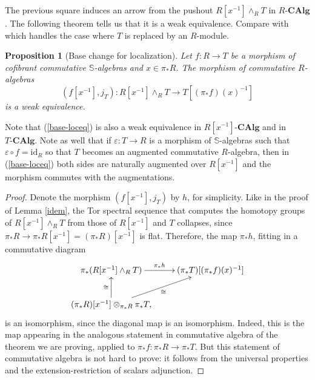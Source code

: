 \documentclass[a4paper,11pt]{amsart} %
\renewcommand{\epsilon}{\varepsilon}
\theoremstyle{definition} \newtheorem{defn}[equation]{Definition}
\theoremstyle{remark} \newtheorem{notation}[equation]{Notation}
\theoremstyle{plain} \newtheorem{teo}[equation]{Theorem}
\theoremstyle{plain} \newtheorem{lema}[equation]{Lemma}
\theoremstyle{plain} \newtheorem{prop}[equation]{Proposition}
\theoremstyle{plain} \newtheorem{corolario}[equation]{Corollary}
\theoremstyle{remark} \newtheorem{obs}[equation]{Remark}
\theoremstyle{remark} \newtheorem{sideobs}[equation]{Side remark}
\theoremstyle{remark} \newtheorem{ejercicio}[equation]{Exercise}
\theoremstyle{definition} \newtheorem{notn}[equation]{Notation}
\theoremstyle{remark} \newtheorem{ej}[equation]{Example}
\theoremstyle{remark} \newtheorem{contraej}[equation]{Counterexample}
\theoremstyle{plain} \newtheorem{conj}[equation]{Conjecture}
\renewcommand{\1}{\ensuremath{\mathbbm{1}}}
\renewcommand{\S}{\mathbb{S}}
\newcommand{\bprop}{\begin{prop}}
\newcommand{\eprop}{\end{prop}}
\newcommand{\bprf}{\begin{proof}}
\newcommand{\eprf}{\end{proof}}
\newcommand{\id}{\mathrm{id}}
\newcommand{\CAlg}{\mbox{-}\mathbf{CAlg}}
\numberwithin{equation}{section}
\begin{document}
The previous square induces an arrow from the pushout $R[x^{-1}]\wedge_R T$ in $R\CAlg$. The following theorem tells us that it is a weak equivalence. Compare with \cite[V.1.15]{ekmm} which handles the case where $T$ is replaced by an $R$-module. 

%
\bprop[Base change for localization]\label{base-loc} Let $f:R\to T$ be a morphism of cofibrant commutative $\S$-algebras and $x\in \pi_*R$. The morphism of commutative $R$-algebras \begin{equation}\label{base-loceq}(f[x^{-1}],j_T): R[x^{-1}] \wedge_R T \to T[(\pi_*f)(x)^{-1}]\end{equation} %
is a weak equivalence.
\eprop
Note that (\ref{base-loceq}) is also a weak equivalence in $R[x^{-1}]\CAlg$ and in $T\CAlg$. Note as well that if $\epsilon:T\to R$ is a morphism of $\S$-algebras such that $\epsilon \circ f=\id_R$ so that $T$ becomes an augmented commutative $R$-algebra, then in (\ref{base-loceq}) both sides are naturally augmented over $R[x^{-1}]$ and the morphism commutes with the augmentations.

\bprf Denote the morphism $(f[x^{-1}],j_T)$ by $h$, for simplicity. Like in the proof of Lemma \ref{idem}, the Tor spectral sequence that computes the homotopy groups of $R[x^{-1}]\wedge_R T$ from those of $R[x^{-1}]$ and $T$ collapses, since $\pi_*R\to \pi_*R[x^{-1}]= (\pi_*R)[x^{-1}]$ is flat. %
Therefore, the map $\pi_*h$, fitting in a commutative diagram
\[\xymatrix{\pi_*(R[x^{-1}]\wedge_R T) \ar[r]^-{\pi_*h}  & (\pi_*T)[(\pi_*f)(x)^{-1}]\\ \ar[u]^-\cong (\pi_*R)[x^{-1}] \otimes_{\pi_*R} \pi_*T, \ar[ru]_-\cong  }\]
is an isomorphism, since the diagonal map is an isomorphism. Indeed, this is the map appearing in the analogous statement in commutative algebra of the theorem we are proving, applied to $\pi_*f: \pi_*R\to \pi_*T$. But this statement of commutative algebra is not hard to prove: it follows from the universal properties and the extension-restriction of scalars adjunction.
\eprf



%
\end{document}
